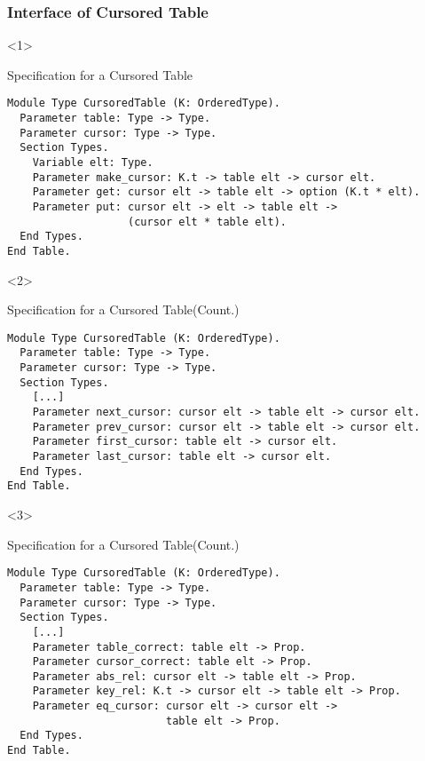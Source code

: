 \documentclass{beamer}
\begin{document}
\begin{frame}[t,fragile]
\frametitle{Interface of Cursored Table}

\begin{onlyenv}<1>
  \begin{block}{Specification for a Cursored Table}
    \begin{verbatim}
Module Type CursoredTable (K: OrderedType).
  Parameter table: Type -> Type.
  Parameter cursor: Type -> Type.
  Section Types.
    Variable elt: Type.
    Parameter make_cursor: K.t -> table elt -> cursor elt.
    Parameter get: cursor elt -> table elt -> option (K.t * elt).
    Parameter put: cursor elt -> elt -> table elt ->
                   (cursor elt * table elt).
  End Types.
End Table.
    \end{verbatim}
  \end{block}
\end{onlyenv}

\begin{onlyenv}<2>
  \begin{block}{Specification for a Cursored Table(Count.)}
    \begin{verbatim}
Module Type CursoredTable (K: OrderedType).
  Parameter table: Type -> Type.
  Parameter cursor: Type -> Type.
  Section Types.
    [...]
    Parameter next_cursor: cursor elt -> table elt -> cursor elt.
    Parameter prev_cursor: cursor elt -> table elt -> cursor elt.
    Parameter first_cursor: table elt -> cursor elt.
    Parameter last_cursor: table elt -> cursor elt.
  End Types.
End Table.
    \end{verbatim}
  \end{block}
\end{onlyenv}

\begin{onlyenv}<3>
  \begin{block}{Specification for a Cursored Table(Count.)}
    \begin{verbatim}
Module Type CursoredTable (K: OrderedType).
  Parameter table: Type -> Type.
  Parameter cursor: Type -> Type.
  Section Types.
    [...]
    Parameter table_correct: table elt -> Prop.
    Parameter cursor_correct: table elt -> Prop.
    Parameter abs_rel: cursor elt -> table elt -> Prop.
    Parameter key_rel: K.t -> cursor elt -> table elt -> Prop.
    Parameter eq_cursor: cursor elt -> cursor elt ->
                         table elt -> Prop.
  End Types.
End Table.
    \end{verbatim}
  \end{block}
\end{onlyenv}


\end{frame}
\end{document}
